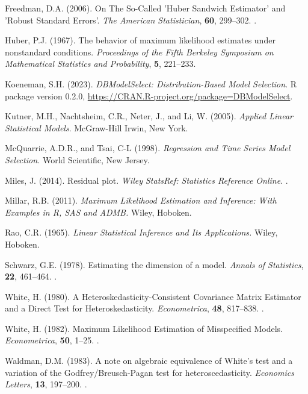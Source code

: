 \documentclass[sn-mathphys-ay]{sn-jnl}
\begin{document}
\begin{thebibliography}{99}
{\rm Freedman, D.A.} (2006).
\newblock On The So-Called 'Huber Sandwich Estimator' and 'Robust Standard Errors'.
\newblock \emph{The American Statistician}, {\bf 60},  299--302.
\newblock {}.

{\rm Huber, P.J.} (1967).
\newblock The behavior of maximum likelihood estimates under nonstandard conditions.
\newblock \emph{Proceedings of the Fifth Berkeley Symposium on Mathematical Statistics and Probability}, {\bf 5},  221--233.

{\rm Koeneman, S.H.} (2023).
\newblock \emph{DBModelSelect: Distribution-Based Model Selection}.
\newblock R package version 0.2.0, \url{https://CRAN.R-project.org/package=DBModelSelect}.

{\rm Kutner, M.H., Nachtsheim, C.R., Neter, J., and Li, W.} (2005).
 \emph{Applied Linear Statistical Models}.
\newblock McGraw-Hill Irwin, New York.

{\rm McQuarrie, A.D.R., and Tsai, C-L} (1998).
 \emph{Regression and Time Series Model Selection.}
\newblock World Scientific, New Jersey.

{\rm Miles, J.} (2014).
\newblock Residual plot.
\newblock \emph{Wiley StatsRef: Statistics Reference Online}.
\newblock {}.

{\rm Millar, R.B.} (2011).
\newblock \emph{Maximum Likelihood Estimation and Inference: With Examples in R, SAS and ADMB.}
\newblock Wiley, Hoboken.

{\rm Rao, C.R.} (1965).
\newblock \emph{Linear Statistical Inference and Its Applications.}
\newblock Wiley, Hoboken.

{\rm Schwarz, G.E.} (1978).
\newblock Estimating the dimension of a model.
\newblock \emph{Annals of Statistics}, {\bf 22},  461--464.
\newblock {}.

{\rm White, H.} (1980).
\newblock A Heteroskedasticity-Consistent Covariance Matrix Estimator and a Direct Test for Heteroskedasticity.
\newblock \emph{Econometrica}, {\bf 48},  817--838.
\newblock {}.

{\rm White, H.} (1982).
\newblock Maximum Likelihood Estimation of Misspecified Models.
\newblock \emph{Econometrica}, {\bf 50},  1--25.
\newblock {}.

{\rm Waldman, D.M.} (1983).
\newblock A note on algebraic equivalence of White's test and a variation of the Godfrey/Breusch-Pagan test for heteroscedasticity.
\newblock \emph{Economics Letters}, {\bf 13},  197--200.
\newblock {}.

\end{thebibliography}

\end{document}
